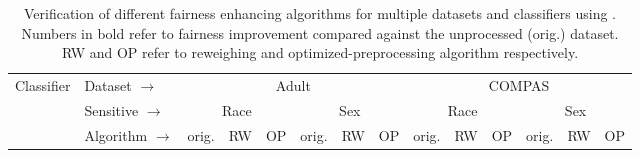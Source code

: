 \begin{sidewaystable}
	\caption[Fairness verification of fairness metrics and algorithms]{Verification of different fairness enhancing algorithms for multiple datasets and classifiers using {\justicia}. Numbers in bold refer to fairness improvement  compared against the unprocessed (orig.) dataset. RW and OP refer to reweighing and optimized-preprocessing algorithm respectively. }\label{fairness_justicia_tab:fair_algo_verification}
	\footnotesize       
    \centering
            \begin{tabular}{ll
            				ccc
            				ccc
            				ccc
            				ccc}
                \toprule
                \multirow{3}{*}{Classifier}& Dataset $ \rightarrow $   & 
                \multicolumn{6}{c}{Adult} &
                \multicolumn{6}{c}{COMPAS} \\ 
                \cmidrule(lr){3-8}
                \cmidrule(lr){9-14}
                & Sensitive  $ \rightarrow $ & 
                \multicolumn{3}{c}{Race}   & \multicolumn{3}{c}{Sex}  &
                \multicolumn{3}{c}{Race}   & \multicolumn{3}{c}{Sex}
                \\ 
                \cmidrule(lr){3-5}
                \cmidrule(lr){6-8}
                \cmidrule(lr){9-11}
                \cmidrule(lr){12-14}

                 & Algorithm  $ \rightarrow $ &  
                orig. & RW & OP & 
                orig. & RW & OP &
                orig. & RW & OP &
                orig. & RW & OP \\ 
                \midrule
          
              
              

\end{tabular}
\end{sidewaystable}
